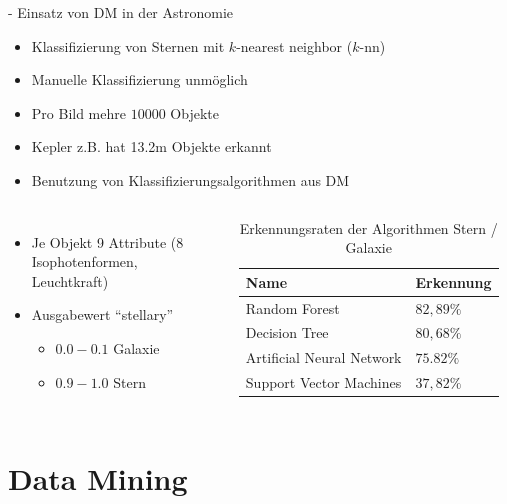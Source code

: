 \documentclass[fleqn,11pt,aspectratio=43]{beamer}
\begin{document}
\begin{frame}{\insertsectionhead - Einsatz von DM in der Astronomie}
\begin{itemize}
\item Klassifizierung von Sternen mit $k$-nearest neighbor ($k$-nn)
\item Manuelle Klassifizierung unmöglich  \cite{ester2000knowledge}
\item Pro Bild mehre $10000$ Objekte
\item Kepler z.B. hat 13.2m Objekte erkannt
\item Benutzung von Klassifizierungsalgorithmen aus DM
\end{itemize}
\begin{columns}[onlytextwidth]
    	\vspace{-5.2em}
		\begin{itemize}
		\item Je Objekt 9 Attribute (8 Isophotenformen, Leuchtkraft)
		\item Ausgabewert \enquote{stellary}
		\begin{itemize}
		\item $0.0 - 0.1$ Galaxie
		\item $0.9 - 1.0$ Stern
		\end{itemize}
		\end{itemize}
	    \begin{table}
	    \begin{tabular}{l|l}
	    Name & Erkennung\\ \hline
	    Random Forest & $82,89\%$ \\
	    Decision Tree & $80,68\%$ \\
	    Artificial Neural Network & $75.82\%$ \\
	    Support Vector Machines & $37,82\%$ \\
	    \end{tabular}
	    \caption{Erkennungsraten der Algorithmen Stern / Galaxie \cite{o2009star}}
	    \end{table}
\end{columns}
\end{frame}

\section{Data Mining~}
\end{document}

